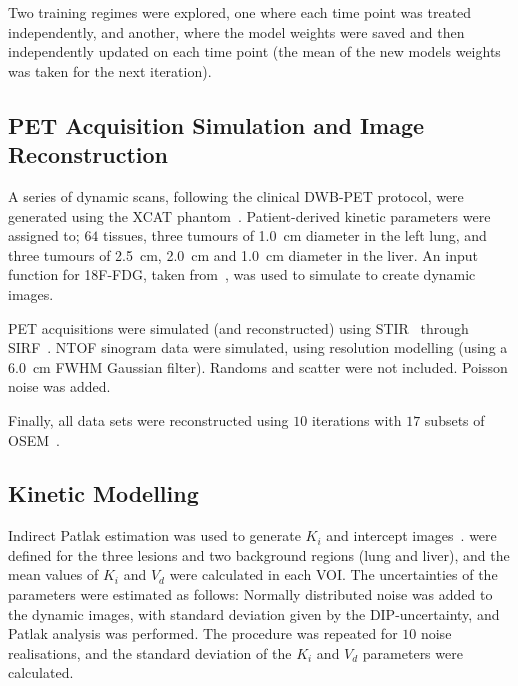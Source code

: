         Two training regimes were explored, one where each time point was treated independently, and another, where the model weights were saved and then independently updated on each time point (the mean of the new models weights was taken for the next iteration).
        
    
    \subsection{\acrshort{PET} Acquisition Simulation and Image Reconstruction} \label{sec:pet_acquisition_simulation_and_image_reconstruction}
        A series of dynamic scans, following the clinical \acrlong{DWB}-\acrshort{PET} protocol, were generated using the \acrshort{XCAT} phantom~\cite{segars4DXCATPhantom2010}. Patient-derived kinetic parameters were assigned to; $64$ tissues, three tumours of \SI{1.0}{\centi\meter} diameter in the left lung, and three tumours of \SI{2.5}{\centi\meter}, \SI{2.0}{\centi\meter} and \SI{1.0}{\centi\meter} diameter in the liver. An input function for \acrshort{18F-FDG}, taken from~\cite{langsjoEffectsSubanestheticKetamine2004}, was used to simulate  to create dynamic images.

        \acrshort{PET} acquisitions were simulated (and reconstructed) using \acrshort{STIR}~\cite{Thielemans2012} through \acrshort{SIRF}~\cite{Ovtchinnikov2017}. \acrlong{NTOF} sinogram data were simulated, using resolution modelling (using a \SI{6.0}{\centi\meter} \acrshort{FWHM} Gaussian filter). Randoms and scatter were not included. Poisson noise was added.%

        Finally, all data sets were reconstructed using $10$ iterations with $17$ subsets of \acrshort{OSEM}~\cite{Hudson1994}.

    
    \subsection{Kinetic Modelling} \label{sec:kinetic_modelling}
        Indirect Patlak estimation was used to generate $K_i$ and intercept images~\cite{patlak1983GraphicalEvaluationBloodtoBrain}.  were defined for the three lesions and two background regions (lung and liver), and the mean values of $K_i$ and $V_d$ were calculated in each \gls{VOI}. The uncertainties of the parameters were estimated as follows: Normally distributed noise was added to the dynamic images, with standard deviation given by the \gls{DIP}-uncertainty, and Patlak analysis was performed. The procedure was repeated for $10$ noise realisations, and the standard deviation of the $K_i$ and $V_d$ parameters were calculated.
        

